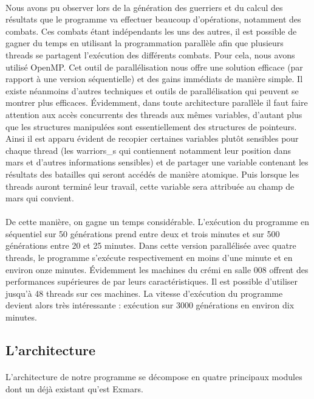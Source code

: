 \documentclass[french]{article}
\begin{document}
            \paragraph{} Nous avons pu observer lors de la génération des guerriers et du calcul des résultats que le programme va effectuer beaucoup d'opérations, notamment des combats. Ces combats étant indépendants les uns des autres, il est possible de gagner du temps en utilisant la programmation parallèle afin que plusieurs threads se partagent l'exécution des différents combats. Pour cela, nous avons utilisé  OpenMP. Cet outil de parallélisation nous offre une solution efficace (par rapport à une version séquentielle) et des gains immédiats de manière simple. Il existe néanmoins d'autres techniques et outils de parallélisation qui peuvent se montrer plus efficaces. Évidemment, dans toute architecture parallèle il faut faire attention aux accès concurrents des threads aux mêmes variables, d'autant plus que les structures manipulées sont essentiellement des structures de pointeurs. Ainsi il est apparu évident de recopier certaines variables plutôt sensibles pour chaque thread (les warriors\_s qui contiennent notamment leur position dans mars et d'autres informations sensibles) et de partager une variable contenant les résultats des batailles qui seront accédés de manière atomique. Puis lorsque les threads auront terminé leur travail, cette variable sera attribuée au champ de mars qui convient.
            \paragraph{} De cette manière, on gagne un temps considérable. L'exécution du programme en séquentiel sur 50 générations prend entre deux et trois minutes et sur 500 générations entre 20 et 25 minutes. Dans cette version parallélisée avec quatre threads, le programme s'exécute respectivement en moins d'une minute et en environ onze minutes. Évidemment les machines du crémi en salle 008 offrent des performances supérieures de par leurs caractéristiques. Il est possible d'utiliser jusqu'à 48 threads sur ces machines. La vitesse d'exécution du programme devient alors très intéressante : exécution sur 3000 générations en environ dix minutes.

        \newpage
        \subsection{L'architecture}
            \paragraph{}L'architecture de notre programme se décompose en quatre principaux modules dont un déjà existant qu'est Exmars.\\
            
\end{document}
